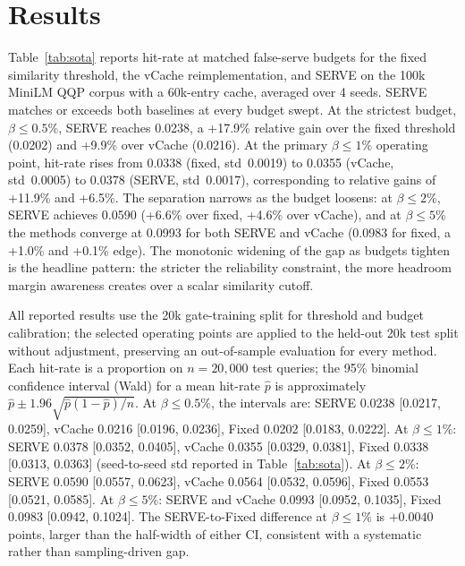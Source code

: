 \section{Results}

Table~\ref{tab:sota} reports hit-rate at matched false-serve budgets for the fixed similarity threshold, the vCache reimplementation, and SERVE on the 100k MiniLM QQP corpus with a 60k-entry cache, averaged over 4 seeds.
SERVE matches or exceeds both baselines at every budget swept.
At the strictest budget, $\beta \le 0.5\%$, SERVE reaches 0.0238, a +17.9\% relative gain over the fixed threshold (0.0202) and +9.9\% over vCache (0.0216).
At the primary $\beta \le 1\%$ operating point, hit-rate rises from 0.0338 (fixed, std~0.0019) to 0.0355 (vCache, std~0.0005) to 0.0378 (SERVE, std~0.0017), corresponding to relative gains of +11.9\% and +6.5\%.
The separation narrows as the budget loosens: at $\beta \le 2\%$, SERVE achieves 0.0590 (+6.6\% over fixed, +4.6\% over vCache), and at $\beta \le 5\%$ the methods converge at 0.0993 for both SERVE and vCache (0.0983 for fixed, a +1.0\% and +0.1\% edge).
The monotonic widening of the gap as budgets tighten is the headline pattern: the stricter the reliability constraint, the more headroom margin awareness creates over a scalar similarity cutoff.

All reported results use the 20k gate-training split for threshold and budget calibration; the selected operating points are applied to the held-out 20k test split without adjustment, preserving an out-of-sample evaluation for every method.
Each hit-rate is a proportion on $n = 20{,}000$ test queries; the 95\% binomial confidence interval (Wald) for a mean hit-rate $\hat{p}$ is approximately $\hat{p} \pm 1.96 \sqrt{\hat{p}(1{-}\hat{p}) / n}$.
At $\beta \le 0.5\%$, the intervals are: SERVE 0.0238 [0.0217, 0.0259], vCache 0.0216 [0.0196, 0.0236], Fixed 0.0202 [0.0183, 0.0222].
At $\beta \le 1\%$: SERVE 0.0378 [0.0352, 0.0405], vCache 0.0355 [0.0329, 0.0381], Fixed 0.0338 [0.0313, 0.0363] (seed-to-seed std reported in Table~\ref{tab:sota}).
At $\beta \le 2\%$: SERVE 0.0590 [0.0557, 0.0623], vCache 0.0564 [0.0532, 0.0596], Fixed 0.0553 [0.0521, 0.0585].
At $\beta \le 5\%$: SERVE and vCache 0.0993 [0.0952, 0.1035], Fixed 0.0983 [0.0942, 0.1024].
The SERVE-to-Fixed difference at $\beta \le 1\%$ is $+0.0040$ points, larger than the half-width of either CI, consistent with a systematic rather than sampling-driven gap.

